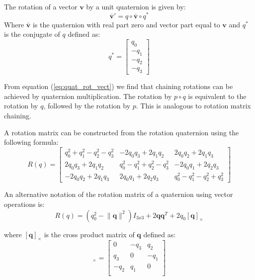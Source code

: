 \documentclass[a4paper]{paper}
\begin{document}
The rotation of a vector $\bm{v}$ by a unit quaternion is given by:
\begin{equation}
    \bar{\bm{v}}' = q \circ \bar{\bm{v}} \circ q^*
\label{eq:quat_rot_vect}
\end{equation}
Where $\bar{\bm{v}}$ is the quaternion with real part zero and vector part equal to $\bm{v}$
and $q^*$ is the conjugate of $q$ defined as:
\begin{equation}
    q^* = \left[ \begin{array}{c} q_0 \\ -q_1 \\ -q_2 \\ -q_3  \end{array} \right]
\end{equation}

From equation (\ref{eq:quat_rot_vect}) we find that chaining rotations can be achieved by quaternion multiplication. The rotation by $p \circ q$ is equivalent to the rotation by $q$, followed by the rotation by $p$. This is analogous to rotation matrix chaining.

A rotation matrix can be constructed from the rotation quaternion using the following formula:
\begin{equation}
    R(q) =
    \left[\begin{matrix}
    q_{0}^{2} + q_{1}^{2} - q_{2}^{2} - q_{3}^{2} &
        - 2 q_{0} q_{3} + 2 q_{1} q_{2} &
        2 q_{0} q_{2} + 2 q_{1} q_{3}\\
    2 q_{0} q_{3} + 2 q_{1} q_{2} &
        q_{0}^{2} - q_{1}^{2} + q_{2}^{2} - q_{3}^{2} &
        - 2 q_{0} q_{1} + 2 q_{2} q_{3}\\
    - 2 q_{0} q_{2} + 2 q_{1} q_{3} &
        2 q_{0} q_{1} + 2 q_{2} q_{3} &
        q_{0}^{2} - q_{1}^{2} - q_{2}^{2} + q_{3}^{2}
    \end{matrix}\right]
\end{equation}

An alternative notation of the rotation matrix of a quaternion using vector operations is:
\begin{equation}
R(q) = (q_0^2 - \lVert\bm{q}\rVert^2) I_{3x3} + 2 \bm{q} \bm{q}^T + 2 q_0 [\bm{q}]_{\times}
\label{eq:rotation_matrix_from_quaternion}
\end{equation}

where $[\bm{q}]_{\times}$ is the cross product matrix of $\bm{q}$ defined as:
\begin{equation}
    [\bm{q}]_{\times} = \left[
    \begin{matrix}
           0 & -q_3 &  q_2 \\
         q_3 &    0 & -q_1 \\
        -q_2 &  q_1 &    0 \\
    \end{matrix}
    \right]
\end{equation}
\end{document}
